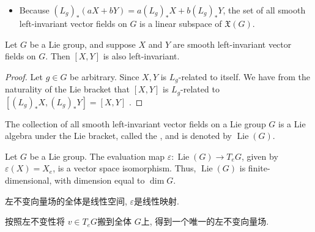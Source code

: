 \documentclass[../main.tex]{subfiles}
\begin{document}
\begin{remark}
    \begin{itemize}
        \item Because \(  \left( L_{g} \right)_{*}\left( aX+ bY \right)=  a\left( L_{g} \right)_{*}X+ b\left( L_{g} \right)_{*}Y      \), the set of all smooth left-invariant vector fields on \(  G  \) is a linear subspace of \(  \mathfrak{X}\left( G \right)   \).   
    \end{itemize}
    
\end{remark}

\begin{proposition}{}{}
Let $G$ be a Lie group, and suppose $X$ and $Y$ are smooth left-invariant vector fields on $G$. Then $[X,Y]$ is also left-invariant.
\end{proposition}

\begin{proof}
    Let \(  g \in G  \) be arbitrary. Since \(  X,Y  \) is \(  L_{g}  \)-related to itself.   We have from the naturality of the Lie bracket that  \(  \left[ X,Y \right]   \) is \(  L_{g}  \)-related to \(  \left[ \left( L_{g} \right)_{*}X, \left( L_{g} \right)_{*}Y   \right]= \left[ X,Y \right]    \) .  
\end{proof}

\begin{corollary}{}{}
    The collection of all smooth left-invariant vector fields on a Lie group \(  G  \) is a Lie algebra under the Lie bracket, called the , and is denoted by \(  \operatorname{Lie}\left( G \right)   \).  
\end{corollary}

\begin{theorem}{}{}
Let $G$ be a Lie group. The evaluation map $\varepsilon\colon \operatorname{Lie}(G)\to T_{e}G$, given by $\varepsilon(X)=X_{e}$, is a vector space isomorphism. Thus, $\operatorname{Lie}(G)$ is finite-dimensional, with dimension equal to $\dim G$.
\end{theorem}

\begin{proofsketch}
    左不变向量场的全体是线性空间, \(   \varepsilon   \)是线性映射.
    
    按照左不变性将 \(  v\in T_{e}G  \)搬到全体 \(  G  \)上, 得到一个唯一的左不变向量场.  
\end{proofsketch}
\end{document}
